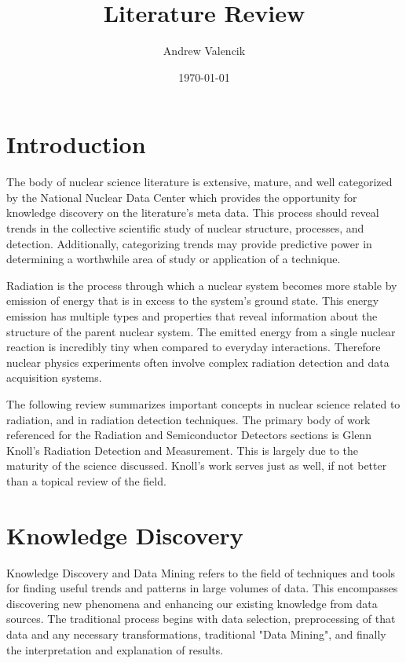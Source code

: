 \documentclass[12pt]{article}
\begin{document}
\title{Literature Review}
\author{Andrew Valencik}
\date{\today}
\maketitle
\tableofcontents
\begin{doublespacing}

\pagebreak
\section{Introduction}

The body of nuclear science literature is extensive, mature, and well categorized by the National Nuclear Data Center \citep{Kurgan200603} which provides the opportunity for knowledge discovery on the literature's meta data.
This process should reveal trends in the collective scientific study of nuclear structure, processes, and detection.
Additionally, categorizing trends may provide predictive power in determining a worthwhile area of study or application of a technique.

Radiation is the process through which a nuclear system becomes more stable by emission of energy that is in excess to the system's ground state.
This energy emission has multiple types and properties that reveal information about the structure of the parent nuclear system.
The emitted energy from a single nuclear reaction is incredibly tiny when compared to everyday interactions.
Therefore nuclear physics experiments often involve complex radiation detection and data acquisition systems. 

The following review summarizes important concepts in nuclear science related to radiation, and in radiation detection techniques.
The primary body of work referenced for the Radiation and Semiconductor Detectors sections is Glenn Knoll's Radiation Detection and Measurement.
This is largely due to the maturity of the science discussed. Knoll's work serves just as well, if not better than a topical review of the field.


\pagebreak
\section{Knowledge Discovery}
Knowledge Discovery and Data Mining refers to the field of techniques and tools for finding useful trends and patterns in large volumes of data.
This encompasses discovering new phenomena and enhancing our existing knowledge from data sources.
The traditional process begins with data selection, preprocessing of that data and any necessary transformations, traditional "Data Mining", and finally the interpretation and explanation of results.


\end{doublespacing}
\end{document}
